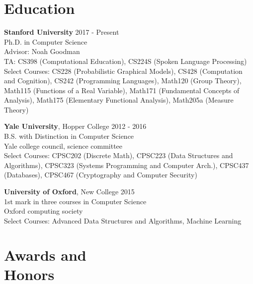 \documentclass[margin, 10pt]{res} %
\begin{document}
\begin{resume}


\section{Education}

\textbf{Stanford University} \hfill 2017 - Present \\
Ph.D. in Computer Science \\
Advisor: Noah Goodman \\
TA: CS398 (Computational Education), CS224S (Spoken Language Processing) \\
Select Courses: CS228 (Probabilistic Graphical Models), CS428 (Computation and Cognition), CS242 (Programming Languages), Math120 (Group Theory), Math115 (Functions of a Real Variable), Math171 (Fundamental Concepts of Analysis), Math175 (Elementary Functional Analysis), Math205a (Measure Theory)

\textbf{Yale University}, Hopper College \hfill 2012 - 2016 \\
B.S. with Distinction in Computer Science \\
Yale college council, science committee \\
Select Courses: CPSC202 (Discrete Math), CPSC223 (Data Structures and Algorithms), CPSC323 (Systems Programming and Computer Arch.), CPSC437 (Databases), CPSC467 (Cryptography and Computer Security)

\textbf{University of Oxford}, New College \hfill 2015 \\
1st mark in three courses in Computer Science\\
Oxford computing society \\
Select Courses: Advanced Data Structures and Algorithms, Machine Learning


\section{Awards and \\ Honors}


\end{resume}
\end{document}
